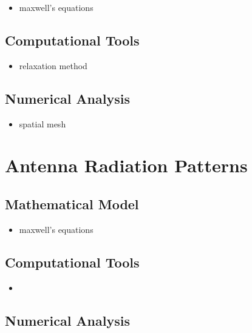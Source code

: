 \documentclass{report}
\begin{document}
            \begin{itemize}
                \item maxwell's equations
            \end{itemize}

        \subsection{Computational Tools}

            \begin{itemize}
                \item relaxation method
            \end{itemize}

        \subsection{Numerical Analysis}

            \begin{itemize}
                \item spatial mesh
            \end{itemize}

    \section{Antenna Radiation Patterns}

        \subsection{Mathematical Model}

            \begin{itemize}
                \item maxwell's equations
            \end{itemize}

        \subsection{Computational Tools}

            \begin{itemize}
                \item 
            \end{itemize}

        \subsection{Numerical Analysis}
\end{document}
